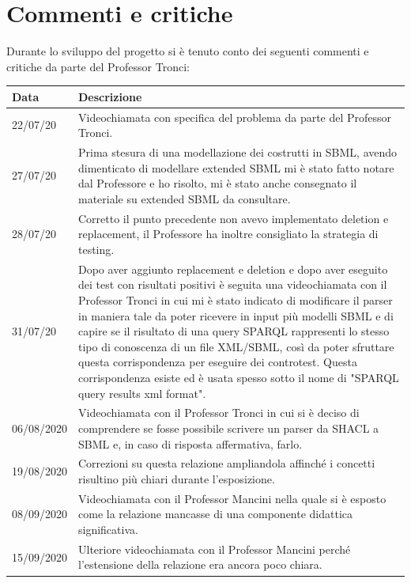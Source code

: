 \documentclass{article}
\begin{document}






\clearpage
\section{Commenti e critiche}
Durante lo sviluppo del progetto si è tenuto conto dei seguenti commenti e critiche da parte del Professor Tronci:

\begin{longtable}{p{2cm}p{9cm}}
    \textbf{Data} & \textbf{Descrizione} \\
    \hline
    22/07/20 & Videochiamata con specifica del problema da parte del Professor Tronci. \\
    \hline
    27/07/20 & Prima stesura di una modellazione dei costrutti in SBML, avendo dimenticato di modellare extended SBML mi è stato fatto notare dal Professore e ho risolto, mi è stato anche consegnato il materiale su extended SBML da consultare. \\
    \hline
    28/07/20 & Corretto il punto precedente non avevo implementato deletion e replacement, il Professore ha inoltre consigliato la strategia di testing. \\
    \hline
    31/07/20 & Dopo aver aggiunto replacement e deletion e dopo aver eseguito dei test con risultati positivi è seguita una videochiamata con il Professor Tronci in cui mi è stato indicato di modificare il parser in maniera tale da poter ricevere in input più modelli SBML e di capire se il risultato di una query SPARQL rappresenti lo stesso tipo di conoscenza di un file XML/SBML, così da poter sfruttare questa corrispondenza per eseguire dei controtest. Questa corrispondenza esiste ed è usata spesso sotto il nome di "SPARQL query results xml format". \\
    \hline
    06/08/2020 & Videochiamata con il Professor Tronci in cui si è deciso di comprendere se fosse possibile scrivere un parser da SHACL a SBML e, in caso di risposta affermativa, farlo. \\
    \hline
    19/08/2020 & Correzioni su questa relazione ampliandola affinché i concetti risultino più chiari durante l'esposizione. \\
    \hline
    08/09/2020 & Videochiamata con il Professor Mancini nella quale si è esposto come la relazione mancasse di una componente didattica significativa. \\
    \hline
    15/09/2020 & Ulteriore videochiamata con il Professor Mancini perché l'estensione della relazione era ancora poco chiara. \\
    \hline
\end{longtable}

\clearpage
{}


{}
\end{document}
